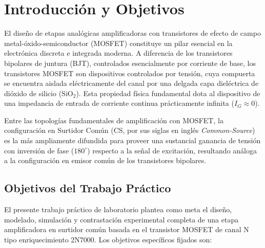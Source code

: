 \chapter{Introducción y Objetivos}
\label{chap:introduccion}

El diseño de etapas analógicas amplificadoras con transistores de efecto de campo metal-óxido-semiconductor (MOSFET)
constituye un pilar esencial en la electrónica discreta e integrada moderna. A diferencia de los transistores
bipolares de juntura (BJT), controlados esencialmente por corriente de base, los transistores MOSFET son dispositivos
controlados por tensión, cuya compuerta se encuentra aislada eléctricamente del canal por una delgada capa dieléctrica
de dióxido de silicio ($\mathrm{SiO}_2$). Esta propiedad física fundamental dota al dispositivo de una impedancia de
entrada de corriente continua prácticamente infinita ($I_G \approx 0$).

Entre las topologías fundamentales de amplificación con MOSFET, la configuración en Surtidor Común (CS, por sus siglas
en inglés \textit{Common-Source}) es la más ampliamente difundida para proveer una sustancial ganancia de tensión con
inversión de fase ($180^\circ$) respecto a la señal de excitación, resultando análoga a la configuración en emisor común
de los transistores bipolares.

\section{Objetivos del Trabajo Práctico}

El presente trabajo práctico de laboratorio plantea como meta el diseño, modelado, simulación y contrastación
experimental completa de una etapa amplificadora en surtidor común basada en el transistor MOSFET de canal N tipo
enriquecimiento 2N7000. Los objetivos específicos fijados son:

